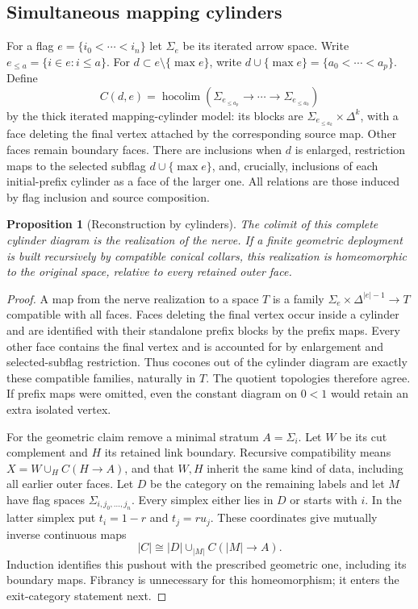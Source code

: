 \documentclass[11pt,a4paper]{article}
\newtheorem{proposition}[theorem]{Proposition}
\theoremstyle{definition}
\begin{document}
\subsection{Simultaneous mapping cylinders}
For a flag $e=\{i_0<\cdots<i_n\}$ let $\Sigma_e$ be its iterated
arrow space. Write $e_{\le a}=\{i\in e:i\le a\}$.
For $d\subset e\setminus\{\max e\}$, write
$d\cup\{\max e\}=\{a_0<\cdots<a_p\}$. Define
\[
 C(d,e)=\operatorname{hocolim}
 (\Sigma_{e_{\le a_p}}\to\cdots\to\Sigma_{e_{\le a_0}})
\]
by the thick iterated mapping-cylinder model: its blocks are
$\Sigma_{e_{\le a_k}}\times\Delta^k$, with a face deleting the final
vertex attached by the corresponding source map. Other faces remain
boundary faces. There are inclusions when $d$ is enlarged, restriction
maps to the selected subflag $d\cup\{\max e\}$, and, crucially,
inclusions of each initial-prefix cylinder as a face of the larger
one. All relations are those induced by flag inclusion and source
composition.

\begin{proposition}[Reconstruction by cylinders]\label{prop:cylinders}
The colimit of this complete cylinder diagram is the realization of
the nerve. If a finite geometric deployment is built recursively by
compatible conical collars, this realization is homeomorphic to the
original space, relative to every retained outer face.
\end{proposition}
\begin{proof}
A map from the nerve realization to a space $T$ is a family
$\Sigma_e\times\Delta^{|e|-1}\to T$ compatible with all faces.
Faces deleting the final vertex occur inside a cylinder and are
identified with their standalone prefix blocks by the prefix maps.
Every other face contains the final vertex and is accounted for by
enlargement and selected-subflag restriction. Thus cocones out of the
cylinder diagram are exactly these compatible families, naturally in
$T$. The quotient topologies therefore agree. If prefix maps were
omitted, even the constant diagram on $0<1$ would retain an extra
isolated vertex.

For the geometric claim remove a minimal stratum $A=\Sigma_i$.
Let $W$ be its cut complement and $H$ its retained link boundary.
Recursive compatibility means
$X=W\cup_H C(H\to A)$, and that $W,H$ inherit the same kind of data,
including all earlier outer faces. Let $D$ be the category on the
remaining labels and let $M$ have flag spaces
$\Sigma_{i,j_0,\ldots,j_n}$. Every simplex either lies in $D$ or starts
with $i$. In the latter simplex put $t_i=1-r$ and $t_j=ru_j$.
These coordinates give mutually inverse continuous maps
\[
 |C|\cong |D|\cup_{|M|}C(|M|\to A).
\]
Induction identifies this pushout with the prescribed geometric one,
including its boundary maps. Fibrancy is unnecessary for this
homeomorphism; it enters the exit-category statement next.
\end{proof}
\end{document}
